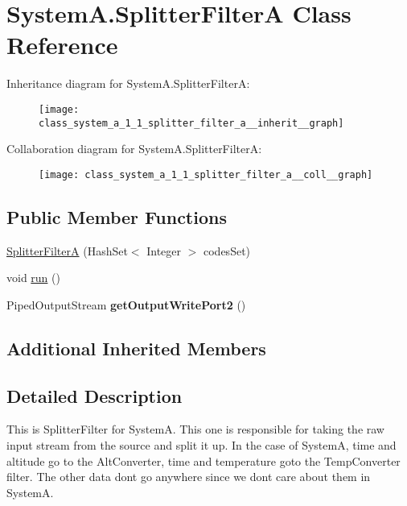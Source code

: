 \hypertarget{class_system_a_1_1_splitter_filter_a}{}\section{System\+A.\+Splitter\+Filter\+A Class Reference}
\label{class_system_a_1_1_splitter_filter_a}


Inheritance diagram for System\+A.\+Splitter\+Filter\+A\+:
\nopagebreak
\begin{figure}[H]
\begin{center}
\leavevmode
\texttt{[image: class\_system\_a\_1\_1\_splitter\_filter\_a\_\_inherit\_\_graph]}
\end{center}
\end{figure}


Collaboration diagram for System\+A.\+Splitter\+Filter\+A\+:
\nopagebreak
\begin{figure}[H]
\begin{center}
\leavevmode
\texttt{[image: class\_system\_a\_1\_1\_splitter\_filter\_a\_\_coll\_\_graph]}
\end{center}
\end{figure}
\subsection*{Public Member Functions}
\begin{DoxyCompactItemize}
\item 
\hyperlink{class_system_a_1_1_splitter_filter_a_a79dc23af7be9dbb22286bce76cb79c18}{Splitter\+Filter\+A} (Hash\+Set$<$ Integer $>$ codes\+Set)
\item 
void \hyperlink{class_system_a_1_1_splitter_filter_a_a7ce43d0ac6d5aaf0c55f5d4417ec286a}{run} ()
\item 
\hypertarget{class_system_a_1_1_splitter_filter_a_abf1e9e0fb5fe6851c77d7724618cf81f}{}Piped\+Output\+Stream {\bfseries get\+Output\+Write\+Port2} ()\label{class_system_a_1_1_splitter_filter_a_abf1e9e0fb5fe6851c77d7724618cf81f}

\end{DoxyCompactItemize}
\subsection*{Additional Inherited Members}


\subsection{Detailed Description}
This is Splitter\+Filter for System\+A. This one is responsible for taking the raw input stream from the source and split it up. In the case of System\+A, time and altitude go to the Alt\+Converter, time and temperature goto the Temp\+Converter filter. The other data don\textquotesingle{}t go anywhere since we don\textquotesingle{}t care about them in System\+A.

